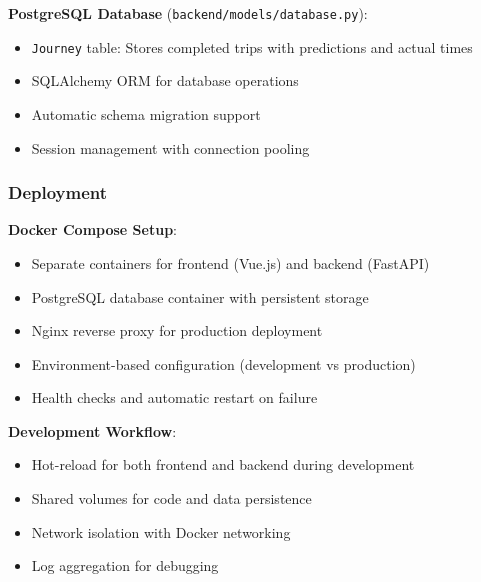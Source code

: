 \textbf{PostgreSQL Database} (\texttt{backend/models/database.py}):
\begin{itemize}
    \item \texttt{Journey} table: Stores completed trips with predictions and actual times
    \item SQLAlchemy ORM for database operations
    \item Automatic schema migration support
    \item Session management with connection pooling
\end{itemize}

\subsubsection{Deployment}

\textbf{Docker Compose Setup}:
\begin{itemize}
    \item Separate containers for frontend (Vue.js) and backend (FastAPI)
    \item PostgreSQL database container with persistent storage
    \item Nginx reverse proxy for production deployment
    \item Environment-based configuration (development vs production)
    \item Health checks and automatic restart on failure
\end{itemize}

\textbf{Development Workflow}:
\begin{itemize}
    \item Hot-reload for both frontend and backend during development
    \item Shared volumes for code and data persistence
    \item Network isolation with Docker networking
    \item Log aggregation for debugging
\end{itemize}

